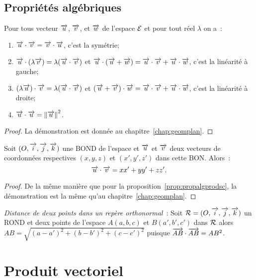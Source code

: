 \subsection{Propriétés algébriques}
\begin{prop}
  \label{prop:propalgprodsc}
  Pour tous vecteur \(\overrightarrow{u}\), \(\overrightarrow{v}\), et \(\overrightarrow{w}\) de l'espace \(\mathcal{E}\) et pour tout réel \(\lambda\) on a~:
  \begin{enumerate}
  \item \(\overrightarrow{u}\cdot\overrightarrow{v}=\overrightarrow{v}\cdot\overrightarrow{u}\), c'est la symétrie;
  \item \(\overrightarrow{u}\cdot(\lambda\overrightarrow{v})=\lambda(\overrightarrow{u}\cdot\overrightarrow{v})\) et \(\overrightarrow{u}\cdot(\overrightarrow{u}+\overrightarrow{w})=\overrightarrow{u}\cdot\overrightarrow{v}+\overrightarrow{u}\cdot\overrightarrow{w}\), c'est la linéarité à gauche;
    \item \((\lambda\overrightarrow{u})\cdot\overrightarrow{v}=\lambda(\overrightarrow{u}\cdot\overrightarrow{v})\) et \((\overrightarrow{u}+\overrightarrow{v})\cdot\overrightarrow{w}=\overrightarrow{u}\cdot\overrightarrow{v}+\overrightarrow{u}\cdot\overrightarrow{w}\), c'est la linéarité à droite;
    \item \(\overrightarrow{u}\cdot\overrightarrow{u}=\left\lVert\overrightarrow{u}\right\rVert^2\).
  \end{enumerate}
\end{prop}
\begin{proof}
  La démonstration est donnée au chapitre~\ref{chap:geomplan}.
\end{proof}
\begin{prop}
  Soit \((O,\overrightarrow{i},\overrightarrow{j},\overrightarrow{k})\) une BOND de l'espace et \(\overrightarrow{u}\) et \(\overrightarrow{v}\) deux vecteurs de coordonnées respectives \((x,y,z)\) et \((x',y',z')\) dans cette BON\@. Alors~:
  \begin{equation}
    \overrightarrow{u}\cdot\overrightarrow{v}=xx'+yy'+zz'.
  \end{equation}
\end{prop}
\begin{proof}
  De la même manière que pour la proposition~\ref{prop:propalgprodsc}, la démonstration est la même qu'au chapitre~\ref{chap:geomplan}.
\end{proof}

\emph{Distance de deux points dans un repère orthonormal}~: Soit \(\mathcal{R}=(O,\overrightarrow{i},\overrightarrow{j},\overrightarrow{k})\) un ROND et deux points de l'espace \(A(a,b,c)\) et \(B(a',b',c')\) dans \(\mathcal{R}\) alors \(AB=\sqrt{(a-a')^2+(b-b')^2+(c-c')^2}\) puisque \(\overrightarrow{AB}\cdot\overrightarrow{AB}=AB^2\).

\section{Produit vectoriel}
\label{sec:prodvec}
